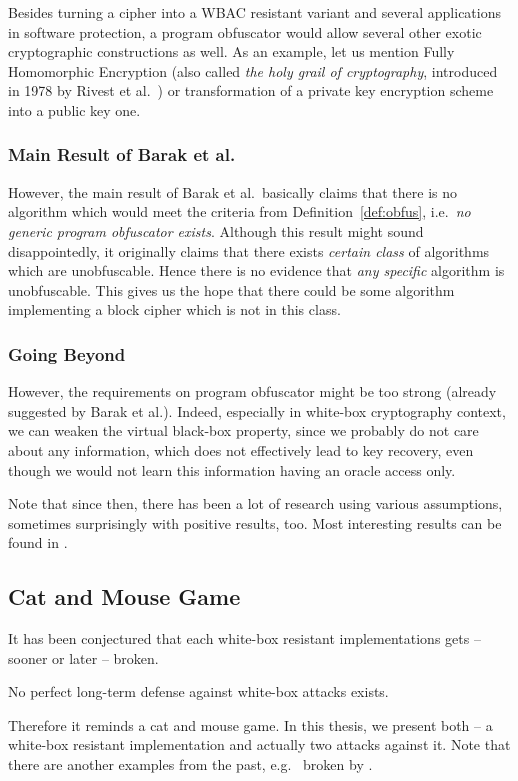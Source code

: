	Besides turning a cipher into a WBAC resistant variant and several applications in software protection, a program obfuscator would allow several other exotic cryptographic constructions as well. As an example, let us mention Fully Homomorphic Encryption (also called {\em the holy grail of cryptography}, introduced in 1978 by Rivest et al.\ \cite{rivest1978data}) or transformation of a private key encryption scheme into a public key one.

\subsubsection{Main Result of Barak et al.}
	
	However, the main result of Barak et al.\ basically claims that there is no algorithm which would meet the criteria from Definition~\ref{def:obfus}, i.e.\ {\em no generic program obfuscator exists}. Although this result might sound disappointedly, it originally claims that there exists {\em certain class} of algorithms which are unobfuscable. Hence there is no evidence that {\em any specific} algorithm is unobfuscable. This gives us the hope that there could be some algorithm implementing a block cipher which is not in this class.

\subsubsection{Going Beyond}
	
	However, the requirements on program obfuscator might be too strong (already suggested by Barak et al.). Indeed, especially in white-box cryptography context, we can weaken the virtual black-box property, since we probably do not care about any information, which does not effectively lead to key recovery, even though we would not learn this information having an oracle access only.
	
	Note that since then, there has been a lot of research using various assumptions, sometimes surprisingly with positive results, too. Most interesting results can be found in \cite{barak2014protecting, brakerski2014virtual}.



\subsection{Cat and Mouse Game}
\label{sec:catmouse}

It has been conjectured that each white-box resistant implementations gets -- sooner or later -- broken.
\begin{conj}
	No perfect long-term defense against white-box attacks exists.
\end{conj}
Therefore it reminds a cat and mouse game. In this thesis, we present both -- a white-box resistant implementation and actually two attacks against it. Note that there are another examples from the past, e.g.\ \cite{chow2002des} broken by \cite{jacob2002attacking}.
